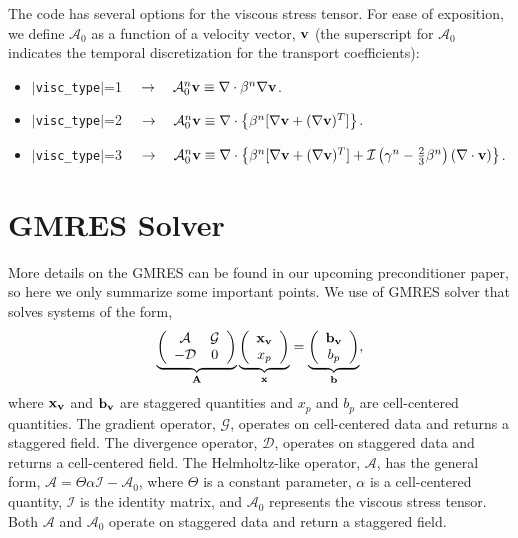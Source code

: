 \documentclass[final]{siamltex}
\def\Ab {{\bf A}}
\def\bb {{\bf b}}
\def\vb {{\bf v}}
\def\xb {{\bf x}}
\begin{document}
The code has several options for the viscous stress tensor.  For ease of exposition,
we define $\mathcal{A}_0$ as a function of a velocity vector, $\vb$ (the superscript
for $\mathcal{A}_0$ indicates the temporal discretization for the transport coefficients):\\
\begin{itemize}
\item $|${\tt visc\_type}$|$=1 $\quad\rightarrow\quad \mathcal{A}_0^n\vb \equiv \nabla\cdot\beta^n\nabla\vb$.\\
\item $|${\tt visc\_type}$|$=2 $\quad\rightarrow\quad \mathcal{A}_0^n\vb \equiv \nabla\cdot\left\{\beta^n[\nabla\vb + (\nabla\vb)^T]\right\}$.\\
\item $|${\tt visc\_type}$|$=3 $\quad\rightarrow\quad \mathcal{A}_0^n\vb \equiv \nabla\cdot\left\{\beta^n[\nabla\vb + (\nabla\vb)^T] + \mathcal{I}\left(\gamma^n - \frac{2}{3}\beta^n\right)(\nabla\cdot\vb)\right\}$.\\
\end{itemize}

\section{GMRES Solver}

More details on the GMRES can be found in our upcoming preconditioner paper,
so here we only summarize some important points.
We use of GMRES solver that solves systems of the form,
\begin{equation}
\underbrace{
\left(\begin{array}{cc}
\mathcal{A} & \mathcal{G} \\
-\mathcal{D} & 0
\end{array}\right)
}_{\Ab}
\underbrace{
\left(\begin{array}{c}
\xb_{\vb} \\
x_p
\end{array}\right)
}_{\xb}
=
\underbrace{
\left(\begin{array}{c}
\bb_{\vb}\\
b_p
\end{array}\right)}_{\bb},
\end{equation}
where $\xb_\vb$ and $\bb_\vb$ are staggered quantities and $x_p$ and $b_p$ are
cell-centered quantities.  The gradient operator, $\mathcal{G}$, operates on
cell-centered data and returns a staggered field.  The divergence operator, 
$\mathcal{D}$, operates on staggered data and returns a cell-centered field.  
The Helmholtz-like operator, $\mathcal{A}$, has the general form,
$\mathcal{A} = \Theta\alpha\mathcal{I} - \mathcal{A}_0$, where
$\Theta$ is a constant parameter,
$\alpha$ is a cell-centered quantity,
$\mathcal{I}$ is the identity matrix, 
and $\mathcal{A}_0$ represents the viscous stress tensor.
Both $\mathcal{A}$ and $\mathcal{A}_0$ operate on staggered data and return
a staggered field.\\
\end{document}
